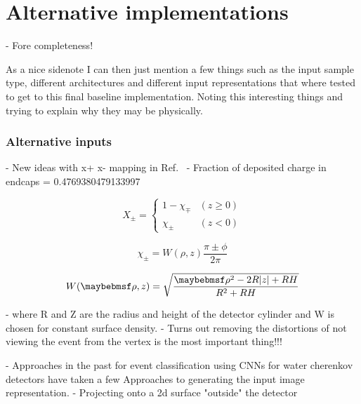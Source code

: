 \section{Alternative implementations} %
\label{sec:cvn_alt} %

- Fore completeness!

As a nice sidenote I can then just mention a few things such as the input sample type, different
architectures and different input representations that where tested to get to this final baseline
implementation. Noting this interesting things and trying to explain why they may be physically.

\subsubsection*{Alternative inputs} %

- New ideas with x+ x- mapping in Ref.~\cite{berns2020}
- Fraction of deposited charge in endcaps = 0.4769380479133997

\begin{equation} %
    X_{\pm}=
    \begin{cases}
        1-\chi_{\mp} & (z \geq 0) \\
        \chi_{\pm}   & (z < 0)
    \end{cases}
\end{equation}

\begin{equation} %
    \chi_{\pm}=W(\rho,z)\frac{\pi\pm\phi}{2\pi}
\end{equation}

\begin{equation}
    W(\rho,z)=\sqrt{\frac{\rho^{2}-2R\abs{z}+RH}{R^{2}+RH}}
\end{equation}

- where R and Z are the radius and height of the detector cylinder and W is chosen for constant
surface density.
- Turns out removing the distortions of not viewing the event from the vertex is the most
important thing!!!

- Approaches in the past for event classification using CNNs for water cherenkov detectors have
taken a few Approaches to generating the input image representation.
- Projecting onto a 2d surface "outside" the detector

